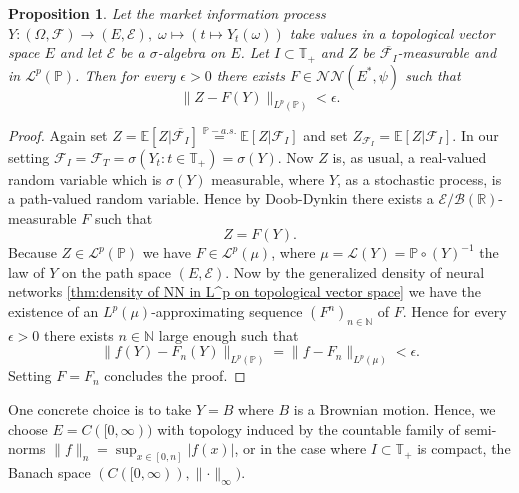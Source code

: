 \documentclass[11pt,a4paper,twoside,openany]{report}
\theoremstyle{plain} %
\newtheorem{proposition}[proposition]{Proposition}
\theoremstyle{definition} %
\theoremstyle{remark} %
\begin{document}
\begin{proposition}\label{prop:reduction to countably generated sigma algebra is not fundamental}
    Let the market information process \(Y:(\Omega,\mathcal{F})\to(E,\mathcal{E}),\; \omega\mapsto \left(t\mapsto Y_t(\omega)\right)\) take values in a topological vector space \(E\) and let \(\mathcal{E}\) be a \(\sigma\)-algebra on \(E\). Let \(I\subset\mathbb{T}_+\) and \(Z\) be \(\overline{\mathcal{F}_I}\)-measurable and in \(\mathcal{L}^p(\mathbb{P})\). Then for every \(\epsilon>0\) there exists \(F\in\mathcal{NN}(E^*,\psi)\) such that 
    \begin{equation}
        \lVert Z-F(Y)\rVert_{L^p(\mathbb{P})}<\epsilon.
    \end{equation}
\end{proposition}
\begin{proof}
    Again set \(Z=\mathbb{E}[Z|\overline{\mathcal{F}_I}]\overset{\mathbb{P}-a.s.}{=}\mathbb{E}[Z|\mathcal{F}_I]\) and set \(Z_{\mathcal{F}_I}=\mathbb{E}[Z|\mathcal{F}_I]\). In our setting \(\mathcal{F}_I=\mathcal{F}_{T}=\sigma(Y_t:t\in\mathbb{T}_+)=\sigma(Y)\). Now \(Z\) is, as usual, a real-valued random variable which is \(\sigma(Y)\) measurable, where \(Y\), as a stochastic process, is a path-valued random variable. Hence by Doob-Dynkin there exists a \(\mathcal{E}/\mathcal{B}(\mathbb{R})\)-measurable \(F\) such that 
    \begin{equation}
        Z = F(Y).
    \end{equation}
    Because \(Z\in\mathcal{L}^p(\mathbb{P})\) we have \(F\in\mathcal{L}^p(\mu)\), where \(\mu=\mathcal{L}(Y)=\mathbb{P}\circ(Y)^{-1}\) the law of \(Y\) on the path space \((E,\mathcal{E})\). Now by the generalized density of neural networks \cref{thm:density of NN in L^p on topological vector space} we have the existence of an \(L^p(\mu)\)-approximating sequence \((F^n)_{n\in\mathbb{N}}\) of \(F\). Hence for every \(\epsilon>0\) there exists \(n\in\mathbb{N}\) large enough such that 
    \begin{equation}
        \lVert f(Y)-F_n(Y)\rVert_{L^p(\mathbb{P})}=\lVert f-F_n\rVert_{L^p(\mu)}<\epsilon.
    \end{equation}
    Setting \(F=F_n\) concludes the proof.
\end{proof}
One concrete choice is to take \(Y=B\) where \(B\) is a Brownian motion. Hence, we choose \(E=C([0,\infty))\) with topology induced by the countable family of semi-norms \(\rVert f\lVert_{n}=\sup_{x\in[0,n]}|f(x)|\), or in the case where \(I\subset\mathbb{T}_+\) is compact, the Banach space \((C([0,\infty)),\lVert\cdot\rVert_{\infty})\). \\\\
\end{document}

